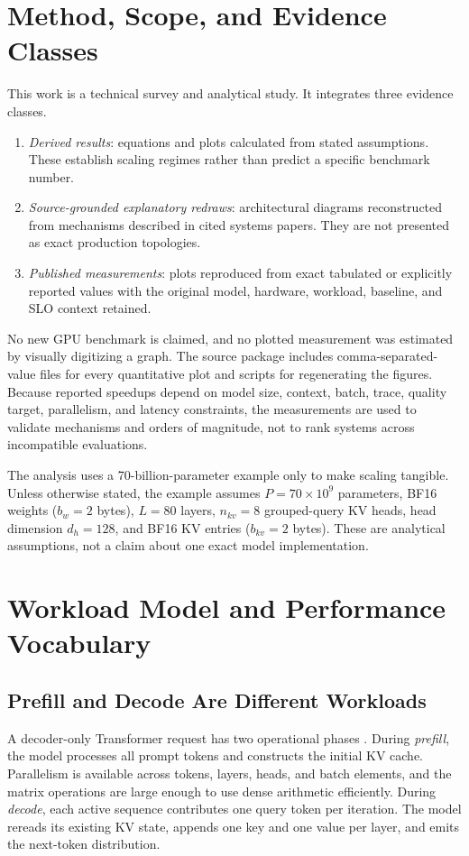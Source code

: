 \documentclass[journal]{IEEEtran}
\begin{document}
\section{Method, Scope, and Evidence Classes}
This work is a technical survey and analytical study. It integrates three evidence classes.
\begin{enumerate}
    \item \emph{Derived results}: equations and plots calculated from stated assumptions. These establish scaling regimes rather than predict a specific benchmark number.
    \item \emph{Source-grounded explanatory redraws}: architectural diagrams reconstructed from mechanisms described in cited systems papers. They are not presented as exact production topologies.
    \item \emph{Published measurements}: plots reproduced from exact tabulated or explicitly reported values with the original model, hardware, workload, baseline, and SLO context retained.
\end{enumerate}
No new GPU benchmark is claimed, and no plotted measurement was estimated by visually digitizing a graph. The source package includes comma-separated-value files for every quantitative plot and scripts for regenerating the figures. Because reported speedups depend on model size, context, batch, trace, quality target, parallelism, and latency constraints, the measurements are used to validate mechanisms and orders of magnitude, not to rank systems across incompatible evaluations.

The analysis uses a 70-billion-parameter example only to make scaling tangible. Unless otherwise stated, the example assumes $P=70\times10^9$ parameters, BF16 weights ($b_w=2$ bytes), $L=80$ layers, $n_{kv}=8$ grouped-query KV heads, head dimension $d_h=128$, and BF16 KV entries ($b_{kv}=2$ bytes). These are analytical assumptions, not a claim about one exact model implementation.

\section{Workload Model and Performance Vocabulary}
\subsection{Prefill and Decode Are Different Workloads}
A decoder-only Transformer request has two operational phases \cite{vaswani2017attention,pope2023efficient}. During \emph{prefill}, the model processes all prompt tokens and constructs the initial KV cache. Parallelism is available across tokens, layers, heads, and batch elements, and the matrix operations are large enough to use dense arithmetic efficiently. During \emph{decode}, each active sequence contributes one query token per iteration. The model rereads its existing KV state, appends one key and one value per layer, and emits the next-token distribution.
\end{document}
